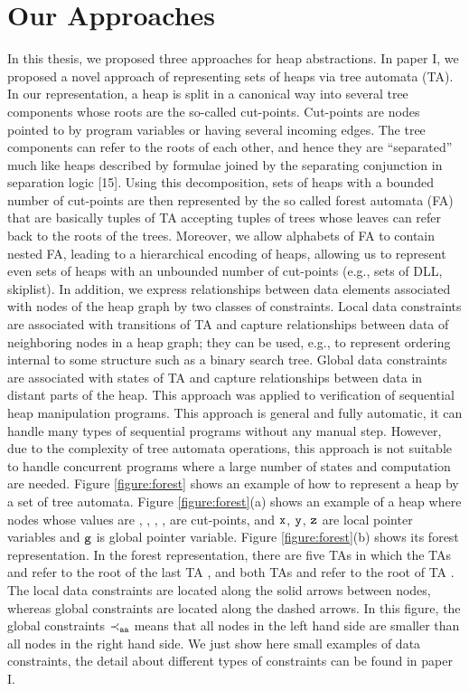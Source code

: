 \section*{Our Approaches}
In this thesis, we proposed three approaches for heap abstractions. In paper I, we proposed a novel approach of representing sets of heaps via tree automata (TA). In our representation, a heap is split in a canonical way into several tree components whose roots are the so-called cut-points. Cut-points are nodes pointed to by program variables or having several incoming edges. The tree components can refer to the roots of each other, and hence they are “separated” much like heaps described by formulae joined by the separating conjunction in separation logic [15]. Using this decomposition, sets of heaps with a bounded number of cut-points are then represented by the so called forest automata (FA) that are basically tuples of TA accepting tuples of trees whose leaves can refer back to the roots of the trees. Moreover, we allow alphabets of FA to contain nested FA, leading to a hierarchical encoding of heaps, allowing us to represent even sets of heaps with an unbounded number of cut-points (e.g., sets of DLL, skiplist). 
In addition, we express relationships between data elements associated with nodes of the heap graph by two classes of constraints. Local data constraints are associated with transitions of TA and capture relationships between data of neighboring nodes in a heap graph; they can be used, e.g., to represent ordering internal to some structure such as a binary search tree. Global data constraints are associated with states of TA and capture relationships between data in distant parts of the heap. This approach was applied to verification of sequential heap manipulation programs. This approach is general and fully automatic, it can handle many types of sequential programs without any manual step. However, due to the complexity of tree automata operations, this approach is not suitable to handle concurrent programs where a large number of states and computation are needed. Figure \ref{figure:forest} shows an example of how to represent a heap by a set of tree automata. Figure \ref{figure:forest}(a) shows an example of a heap where nodes whose values are \nodea, \nodeb, \nodec, \noded, \nodee \; are cut-points, and $\tt x$, $\tt y$, $\tt z$ are local pointer variables and $\tt g$ is global pointer variable. Figure \ref{figure:forest}(b) shows its forest representation. In the forest representation, there are five TAs in which the TAs \taa \; and \tac \; refer to the root of the last TA \tae\;, and both TAs \tab \; and \tad \; refer to the root of TA \tac \;. The local data constraints are located along the solid arrows between nodes, whereas global constraints are located along the dashed arrows. In this figure, the global constraints $\tt \prec_{aa}$ means that all nodes in the left hand side are smaller than all nodes in the right hand side. We just show here small examples of data constraints, the detail about different types of constraints can be found in paper I.   

